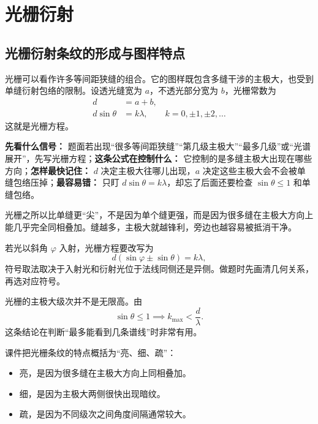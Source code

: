 \documentclass[lang=cn,11pt]{elegantbook}
\newcommand{\bridge}[1]{\begin{note}#1\end{note}}
\begin{document}
\section{光栅衍射}

\subsection{光栅衍射条纹的形成与图样特点}

光栅可以看作许多等间距狭缝的组合。它的图样既包含多缝干涉的主极大，也受到单缝衍射包络的限制。设透光缝宽为 \(a\)，不透光部分宽为 \(b\)，光栅常数为
\[
\begin{aligned}
d&=a+b,\\
d\sin\theta&=k\lambda,\qquad k=0,\pm1,\pm2,\dots
\end{aligned}
\]
这就是光栅方程。

\begin{note}
\textbf{先看什么信号：} 题面若出现“很多等间距狭缝”“第几级主极大”“最多几级”或“光谱展开”，先写光栅方程；\textbf{这条公式在控制什么：} 它控制的是多缝主极大出现在哪些方向；\textbf{怎样最快记住：} \(d\) 决定主极大往哪儿出现，\(a\) 决定这些主极大会不会被单缝包络压掉；\textbf{最容易错：} 只盯 \(d\sin\theta=k\lambda\)，却忘了后面还要检查 \(\sin\theta\le 1\) 和单缝包络。
\end{note}

\bridge{光栅之所以比单缝更“尖”，不是因为单个缝更强，而是因为很多缝在主极大方向上能几乎完全同相叠加。缝越多，主极大就越锋利，旁边也越容易被抵消干净。}

\begin{note}
若光以斜角 \(\varphi\) 入射，光栅方程要改写为
\[
d(\sin\varphi\pm\sin\theta)=k\lambda,
\]
符号取法取决于入射光和衍射光位于法线同侧还是异侧。做题时先画清几何关系，再选对应符号。
\end{note}

\begin{remark}
光栅的主极大级次并不是无限高。由
\[
\sin\theta\le 1 \implies k_{\max}<\frac{d}{\lambda}.
\]
这条结论在判断“最多能看到几条谱线”时非常有用。
\end{remark}

\begin{remark}
课件把光栅条纹的特点概括为“亮、细、疏”：
\begin{itemize}
  \item 亮，是因为很多缝在主极大方向上同相叠加。
  \item 细，是因为主极大两侧很快出现暗纹。
  \item 疏，是因为不同级次之间角度间隔通常较大。
\end{itemize}
\end{remark}
\end{document}

